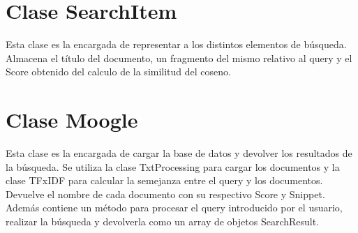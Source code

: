 \documentclass{article}
\begin{document}
\begin{center}
\section*{\textcolor{graphcolor}{{\centering Clase SearchItem}}}
Esta clase es la encargada de representar a los distintos elementos de búsqueda. Almacena el título del documento, un fragmento del mismo relativo al query y el Score obtenido del calculo de la similitud del coseno.


\section*{\textcolor{graphcolor}{{\centering Clase Moogle}}}
Esta clase es la encargada de cargar la base de datos y devolver los resultados de la búsqueda. Se utiliza la clase TxtProcessing para cargar los documentos y la clase TFxIDF para calcular la semejanza entre el query y los documentos. Devuelve el nombre de cada documento con su respectivo Score y Snippet.
 Además contiene un método para procesar el query introducido por el usuario, realizar la búsqueda y devolverla como un array de objetos SearchResult.


\end{center}
\end{document}
